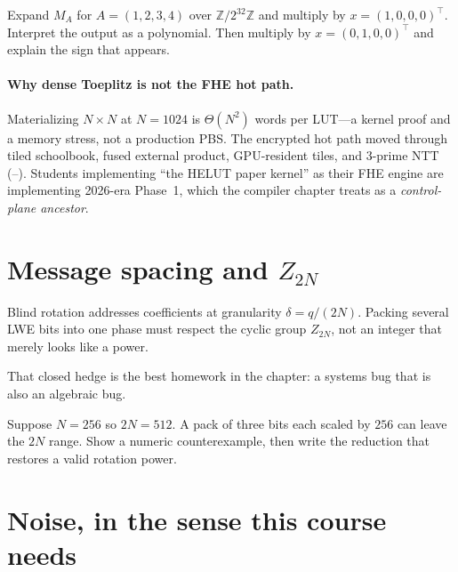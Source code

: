 \begin{exercise}
Expand $M_A$ for $A=(1,2,3,4)$ over $\mathbb{Z}/2^{32}\mathbb{Z}$ and multiply
by $x=(1,0,0,0)^\top$.
Interpret the output as a polynomial. Then multiply by $x=(0,1,0,0)^\top$ and
explain the sign that appears.
\end{exercise}

\paragraph{Why dense Toeplitz is not the FHE hot path.}
Materializing $N\times N$ at $N=1024$ is $\Theta(N^2)$ words per LUT---a
kernel proof and a memory stress, not a production PBS.
The encrypted hot path moved through tiled schoolbook, fused external product,
GPU-resident tiles, and 3-prime NTT (--).
Students implementing ``the HELUT paper kernel'' as their FHE engine are
implementing 2026-era Phase~1, which the compiler chapter treats as a
\emph{control-plane ancestor}.

\section{Message spacing and \texorpdfstring{$Z_{2N}$}{Z\_2N}}

Blind rotation addresses coefficients at granularity $\delta = q/(2N)$.
Packing several LWE bits into one phase must respect the cyclic group
$Z_{2N}$, not an integer that merely looks like a power.


That closed hedge is the best homework in the chapter: a systems bug that is
also an algebraic bug.

\begin{exercise}
Suppose $N=256$ so $2N=512$. A pack of three bits each scaled by $256$ can
leave the $2N$ range.
Show a numeric counterexample, then write the reduction that restores a
valid rotation power.
\end{exercise}

\section{Noise, in the sense this course needs}

